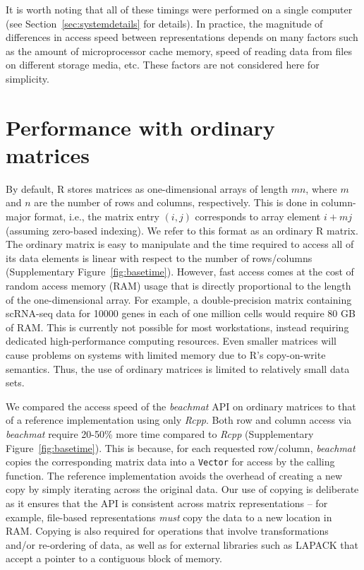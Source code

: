 \documentclass{article}
\newcommand{\beachmat}{\textit{beachmat}}
\newcommand{\code}[1]{\texttt{#1}}
\begin{document}
It is worth noting that all of these timings were performed on a single computer (see Section~\ref{sec:systemdetails} for details). 
In practice, the magnitude of differences in access speed between representations depends on many factors such as the amount of microprocessor cache memory, speed of reading data from files on different storage media, etc.
These factors are not considered here for simplicity.

\section{Performance with ordinary matrices}
By default, R stores matrices as one-dimensional arrays of length $mn$, where $m$ and $n$ are the number of rows and columns, respectively.
This is done in column-major format, i.e., the matrix entry $(i, j)$ corresponds to array element $i + mj$ (assuming zero-based indexing).
We refer to this format as an ordinary R matrix.
The ordinary matrix is easy to manipulate and the time required to access all of its data elements is linear with respect to the number of rows/columns (Supplementary Figure~\ref{fig:basetime}).
However, fast access comes at the cost of random access memory (RAM) usage that is directly proportional to the length of the one-dimensional array.
For example, a double-precision matrix containing scRNA-seq data for 10000 genes in each of one million cells would require 80 GB of RAM.
This is currently not possible for most workstations, instead requiring dedicated high-performance computing resources.
Even smaller matrices will cause problems on systems with limited memory due to R's copy-on-write semantics.
Thus, the use of ordinary matrices is limited to relatively small data sets.


We compared the access speed of the \beachmat{} API on ordinary matrices to that of a reference implementation using only \textit{Rcpp}.
Both row and column access via \beachmat{} require 20-50\% more time compared to \textit{Rcpp} (Supplementary Figure~\ref{fig:basetime}).
This is because, for each requested row/column, \beachmat{} copies the corresponding matrix data into a \code{Vector} for access by the calling function.
The reference implementation avoids the overhead of creating a new copy by simply iterating across the original data.
Our use of copying is deliberate as it ensures that the API is consistent across matrix representations -- for example, file-based representations \textit{must} copy the data to a new location in RAM.
Copying is also required for operations that involve transformations and/or re-ordering of data, as well as for external libraries such as LAPACK that accept a pointer to a contiguous block of memory.
\end{document}
